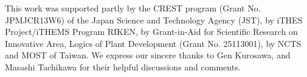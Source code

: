 \documentclass[ amsmath,amssymb,nofootinbib
]{revtex4-1}
\begin{document}
This work was supported partly by the CREST program (Grant No. JPMJCR13W6) of the Japan Science and Technology Agency (JST),  by iTHES Project/iTHEMS Program RIKEN, by Grant-in-Aid for Scientific Research on Innovative Area, Logics of Plant Development (Grant No. 25113001),  by NCTS and MOST of Taiwan. We express our sincere thanks to Gen Kurosawa, and Masashi Tachikawa for their helpful discussions and comments.




%
%
\end{document}
